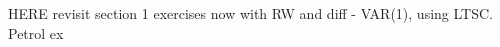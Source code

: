 \documentclass[a4paper]{book}
\begin{document}

HERE revisit section 1 exercises now with RW and diff - VAR(1), using LTSC.  Petrol ex
\end{document}
